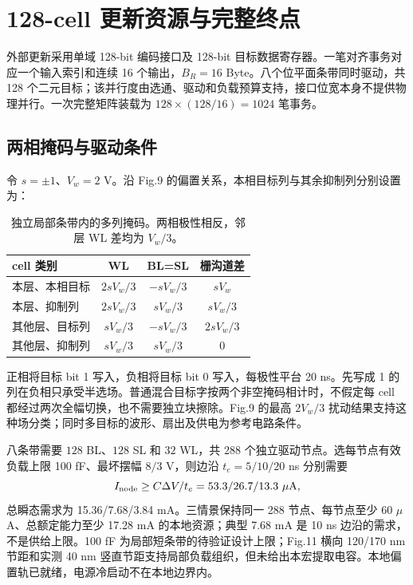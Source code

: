 \clearpage
\section{128-cell 更新资源与完整终点}

外部更新采用单域 128-bit 编码接口及 128-bit 目标数据寄存器。一笔对齐事务对应一个输入索引和连续 16 个输出，$B_R=16$ Byte。八个位平面条带同时驱动，共 128 个二元目标；该并行度由选通、驱动和负载预算支持，接口位宽本身不提供物理并行。一次完整矩阵装载为 $128\times(128/16)=1024$ 笔事务。

\subsection{两相掩码与驱动条件}
令 $s=\pm1$、$V_w=2$ V。沿  Fig.9 的偏置关系，本相目标列与其余抑制列分别设置为：

\begin{table}[htbp]\centering\small
\begin{tabular}{@{}lccc@{}}\toprule
cell 类别 & WL & BL=SL & 栅沟道差\\\midrule
本层、本相目标 & $2sV_w/3$ & $-sV_w/3$ & $sV_w$\\
本层、抑制列 & $2sV_w/3$ & $sV_w/3$ & $sV_w/3$\\
其他层、目标列 & $sV_w/3$ & $-sV_w/3$ & $2sV_w/3$\\
其他层、抑制列 & $sV_w/3$ & $sV_w/3$ & $0$\\\bottomrule
\end{tabular}
\caption{独立局部条带内的多列掩码。两相极性相反，邻层 WL 差均为 $V_w/3$。}
\end{table}

正相将目标 bit 1 写入，负相将目标 bit 0 写入，每极性平台 20 ns。先写成 1 的列在负相只承受半选场。普通混合目标字按两个非空掩码相计时，不假定每 cell 都经过两次全幅切换，也不需要独立块擦除。Fig.9 的最高 $2V_w/3$ 扰动结果支持这种场分类；同时多目标的波形、扇出及供电为参考电路条件。

八条带需要 $128$ BL、$128$ SL 和 $32$ WL，共 288 个独立驱动节点。选每节点有效负载上限 100 fF、最坏摆幅 $8/3$ V，则边沿 $t_e=5/10/20$ ns 分别需要
\[
I_{\rm node}\ge C\Delta V/t_e=53.3/26.7/13.3\ \mu\mathrm A,
\]
总瞬态需求为 15.36/7.68/3.84 mA。三情景保持同一 288 节点、每节点至少 60 $\mu$A、总额定能力至少 17.28 mA 的本地资源；典型 7.68 mA 是 10 ns 边沿的需求，不是供给上限。100 fF 为局部短条带的待验证设计上限；Fig.11 横向 120/170 nm 节距和实测 40 nm 竖直节距支持局部负载组织，但未给出本宏提取电容。本地偏置轨已就绪，电源冷启动不在本地边界内。

